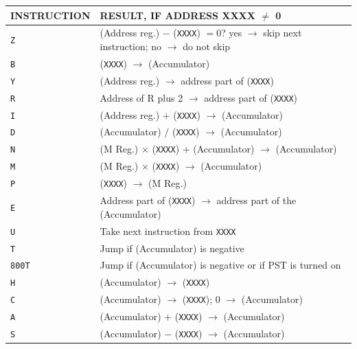 \begin{tabularx}{\textwidth}{lX}
	\textbf{INSTRUCTION} & \textbf{RESULT, IF ADDRESS XXXX $\ne$ 0} \\
	\midrule
	\texttt{Z} & (Address reg.) $-$ (\texttt{XXXX}) $= 0$? yes $\rightarrow$ skip next instruction; no $\rightarrow$ do not skip \\
	\texttt{B} & (\texttt{XXXX}) $\rightarrow$ (Accumulator) \\
	\texttt{Y} & (Address reg.) $\rightarrow$ address part of (\texttt{XXXX}) \\
	\texttt{R} & Address of R plus 2 $\rightarrow$ address part of (\texttt{XXXX}) \\
	\texttt{I} & (Address reg.) $+$ (\texttt{XXXX}) $\rightarrow$ (Accumulator) \\
	\texttt{D} & (Accumulator) $/$ (\texttt{XXXX}) $\rightarrow$ (Accumulator) \\
	\texttt{N} & (M Reg.) $\times$ (\texttt{XXXX}) $+$ (Accumulator) $\rightarrow$ (Accumulator) \\
	\texttt{M} & (M Reg.) $\times$ (\texttt{XXXX}) $\rightarrow$ (Accumulator) \\
	\texttt{P} & (\texttt{XXXX}) $\rightarrow$ (M Reg.) \\
	\texttt{E} & Address part of (\texttt{XXXX}) $\rightarrow$ address part of the (Accumulator) \\
	\texttt{U} & Take next instruction from \texttt{XXXX} \\
	\texttt{T} & Jump if (Accumulator) is negative \\
	\texttt{800T} & Jump if (Accumulator) is negative or if PST is turned on \\
	\texttt{H} & (Accumulator) $\rightarrow$ (\texttt{XXXX}) \\
	\texttt{C} & (Accumulator) $\rightarrow$ (\texttt{XXXX}); 0 $\rightarrow$ (Accumulator) \\
	\texttt{A} & (Accumulator) $+$ (\texttt{XXXX}) $\rightarrow$ (Accumulator) \\
	\texttt{S} & (Accumulator) $-$ (\texttt{XXXX}) $\rightarrow$ (Accumulator) \\
\end{tabularx}

\vspace{0.5cm}

